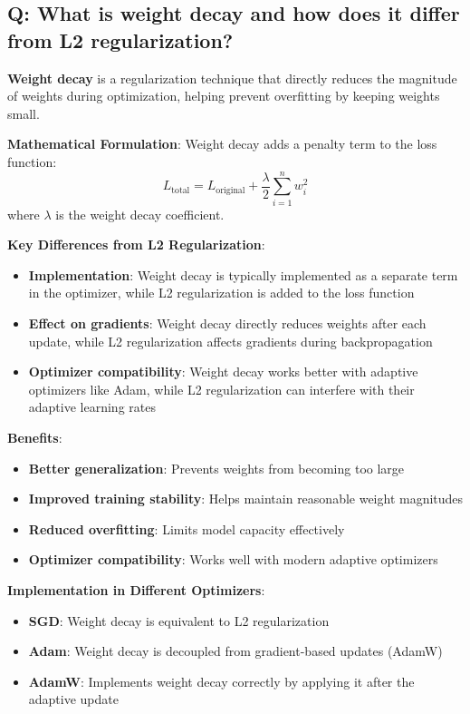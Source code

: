 \subsection*{\textcolor{primaryteal}{Q: What is weight decay and how does it differ from L2 regularization?}}
\textbf{Weight decay} is a regularization technique that directly reduces the magnitude of weights during optimization, helping prevent overfitting by keeping weights small.

\textbf{Mathematical Formulation}: Weight decay adds a penalty term to the loss function:
\[
	L_{\text{total}} = L_{\text{original}} + \frac{\lambda}{2} \sum_{i=1}^{n} w_i^2
\]
where $\lambda$ is the weight decay coefficient.

\textbf{Key Differences from L2 Regularization}:
\begin{itemize}
	\item \textbf{Implementation}: Weight decay is typically implemented as a separate term in the optimizer, while L2 regularization is added to the loss function
	\item \textbf{Effect on gradients}: Weight decay directly reduces weights after each update, while L2 regularization affects gradients during backpropagation
	\item \textbf{Optimizer compatibility}: Weight decay works better with adaptive optimizers like Adam, while L2 regularization can interfere with their adaptive learning rates
\end{itemize}

\textbf{Benefits}:
\begin{itemize}
	\item \textbf{Better generalization}: Prevents weights from becoming too large
	\item \textbf{Improved training stability}: Helps maintain reasonable weight magnitudes
	\item \textbf{Reduced overfitting}: Limits model capacity effectively
	\item \textbf{Optimizer compatibility}: Works well with modern adaptive optimizers
\end{itemize}

\textbf{Implementation in Different Optimizers}:
\begin{itemize}
	\item \textbf{SGD}: Weight decay is equivalent to L2 regularization
	\item \textbf{Adam}: Weight decay is decoupled from gradient-based updates (AdamW)
	\item \textbf{AdamW}: Implements weight decay correctly by applying it after the adaptive update
\end{itemize}

